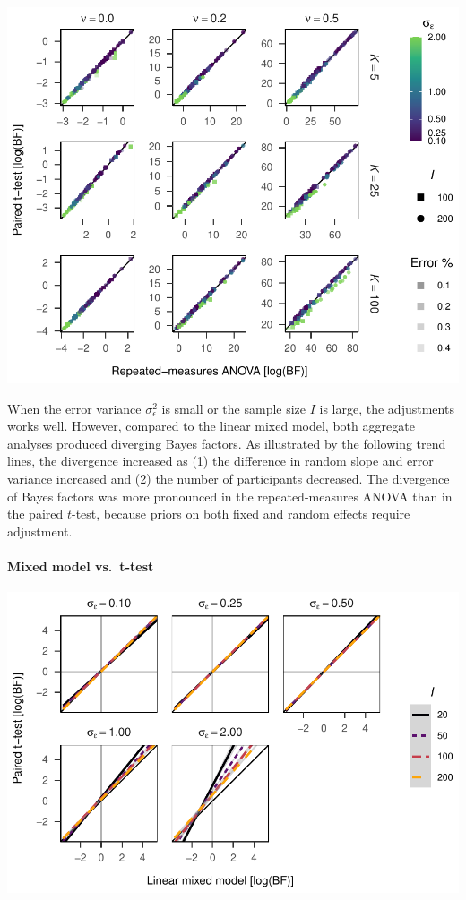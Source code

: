 \documentclass[
  a4paper,
  DIV=11,
  numbers=noendperiod,
  oneside]{scrartcl}
\let\oldparagraph\paragraph
\renewcommand{\paragraph}[1]{\oldparagraph{#1}\mbox{}}
\begin{document}
\includegraphics{prior_translation_files/figure-pdf/simulation-results3-details-2.pdf}

When the error variance \(\sigma_\epsilon^2\) is small or the sample
size \(I\) is large, the adjustments works well. However, compared to
the linear mixed model, both aggregate analyses produced diverging Bayes
factors. As illustrated by the following trend lines, the divergence
increased as (1) the difference in random slope and error variance
increased and (2) the number of participants decreased. The divergence
of Bayes factors was more pronounced in the repeated-measures ANOVA than
in the paired \(t\)-test, because priors on both fixed and random
effects require adjustment.

\hypertarget{mixed-model-vs.-t-test-1}{%
\paragraph{Mixed model vs.~t-test}\label{mixed-model-vs.-t-test-1}}

\includegraphics{prior_translation_files/figure-pdf/trend-plots-ttest-1.pdf}
\end{document}
